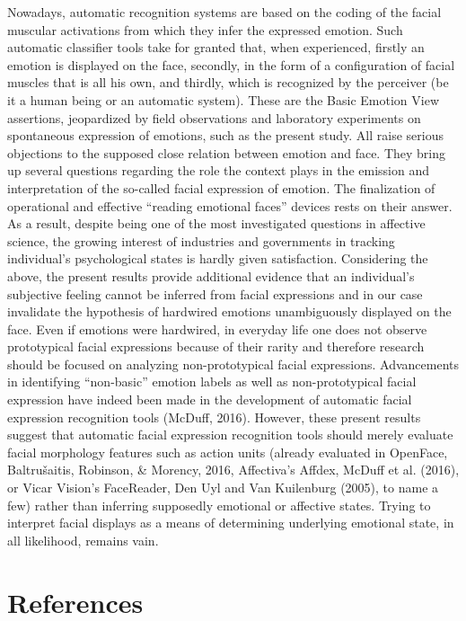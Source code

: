 \documentclass[man]{apa6}
\begin{document}
Nowadays, automatic recognition systems are based on the coding of the facial muscular activations from which they infer the expressed emotion. Such automatic classifier tools take for granted that, when experienced, firstly an emotion is displayed on the face, secondly, in the form of a configuration of facial muscles that is all his own, and thirdly, which is recognized by the perceiver (be it a human being or an automatic system). These are the Basic Emotion View assertions, jeopardized by field observations and laboratory experiments on spontaneous expression of emotions, such as the present study. All raise serious objections to the supposed close relation between emotion and face. They bring up several questions regarding the role the context plays in the emission and interpretation of the so-called facial expression of emotion. The finalization of operational and effective \enquote{reading emotional faces} devices rests on their answer. As a result, despite being one of the most investigated questions in affective science, the growing interest of industries and governments in tracking individual's psychological states is hardly given satisfaction. Considering the above, the present results provide additional evidence that an individual's subjective feeling cannot be inferred from facial expressions and in our case invalidate the hypothesis of hardwired emotions unambiguously displayed on the face. Even if emotions were hardwired, in everyday life one does not observe prototypical facial expressions because of their rarity and therefore research should be focused on analyzing non-prototypical facial expressions. Advancements in identifying \enquote{non-basic} emotion labels as well as non-prototypical facial expression have indeed been made in the development of automatic facial expression recognition tools (McDuff, 2016). However, these present results suggest that automatic facial expression recognition tools should merely evaluate facial morphology features such as action units (already evaluated in OpenFace, Baltrušaitis, Robinson, \& Morency, 2016, Affectiva's Affdex, McDuff et al. (2016), or Vicar Vision's FaceReader, Den Uyl and Van Kuilenburg (2005), to name a few) rather than inferring supposedly emotional or affective states. Trying to interpret facial displays as a means of determining underlying emotional state, in all likelihood, remains vain.

\newpage

\hypertarget{references}{%
\section{References}\label{references}}
\end{document}
